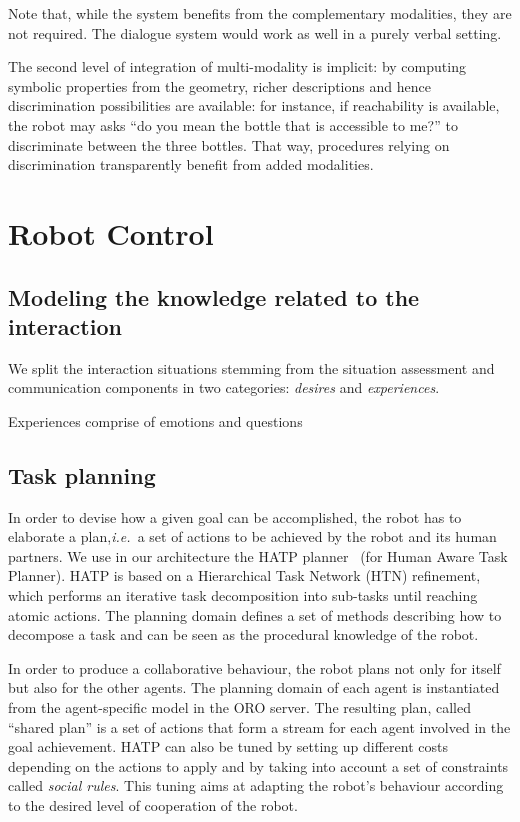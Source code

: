 \documentclass[letterpaper, 10 pt, conference]{ieeeconf}  %
\newcommand{\ie}{{\textit{i.e.\ }}}
\begin{document}
Note that, while the system benefits from the complementary modalities, they
are not required. The dialogue system would work as well in a purely verbal
setting.

The second level of integration of multi-modality is implicit: by computing
symbolic properties from the geometry, richer descriptions and hence
discrimination possibilities are available: for instance, if reachability is
available, the robot may asks ``do you mean the bottle that is accessible to
me?'' to discriminate between the three bottles. That way, procedures relying
on discrimination transparently benefit from added modalities.

\section{Robot Control}
\label{sect|ctrl}

\subsection{Modeling the knowledge related to the interaction}

We split the interaction situations stemming from the situation assessment and
communication components in two categories: \emph{desires} and
\emph{experiences}.

Experiences comprise of emotions and questions

\subsection{Task planning}

In order to devise how a given goal can be accomplished, the robot has to
elaborate a plan,\ie a set of actions to be achieved by the robot and its human
partners.  We use in our architecture the HATP planner~\cite{Alili2009} (for
Human Aware Task Planner).  HATP is based on a Hierarchical Task Network (HTN)
refinement, which performs an iterative task decomposition into sub-tasks until
reaching atomic actions.  The planning domain defines a set of methods
describing how to decompose a task and can be seen as the procedural knowledge
of the robot.

In order to produce a collaborative behaviour, the robot plans not only for
itself but also for the other agents. The planning domain of each agent is
instantiated from the agent-specific model in the ORO server. The resulting
plan, called ``shared plan'' is a set of actions that form a stream for each
agent involved in the goal achievement. HATP can also be tuned by setting up
different costs depending on the actions to apply and by taking into account a
set of constraints called \emph{social rules}. This tuning aims at adapting the
robot's behaviour according to the desired level of cooperation of the robot.
\end{document}
